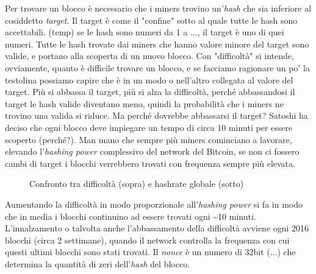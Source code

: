 \documentclass {article}
\begin{document}
Per trovare un blocco è necessario che i miners trovino un'\textit{hash} che sia inferiore al cosiddetto \textit{target}. Il target è come il "confine" sotto al quale tutte le hash sono accettabili.
(temp) se le hash sono numeri da 1 a ..., il target è uno di quei numeri.
Tutte le hash trovate dai miners che hanno valore minore del target sono valide, e portano alla scoperta di un nuovo blocco.
Con "difficoltà" si intende, ovviamente, quanto è difficile trovare un blocco, e se facciamo ragionare un po' la testolina possiamo capire che è in un modo o nell'altro collegata al valore del target.
Più si abbassa il target, più si alza la difficoltà, perché abbassandosi il target le hash valide diventano meno, quindi la probabilità che i miners ne trovino una valida si riduce.
Ma perché dovrebbe abbassarsi il target?
Satoshi ha deciso che ogni blocco deve impiegare un tempo di circa 10 minuti per essere scoperto (perché?).
Man mano che sempre più miners cominciano a lavorare, elevando l'\textit{hashing power} complessivo del network del Bitcoin, se non ci fossero cambi di target i blocchi verrebbero trovati con frequenza sempre più elevata.

\vspace {0.5cm}
\begin{figure}[h]
\caption {Confronto tra difficoltà (sopra) e hashrate globale (sotto)}
\end{figure}
\vspace {0.2cm}
\noindent
%
Aumentando la difficoltà in modo proporzionale all'\textit{hashing power} si fa in modo che in media i blocchi continuino ad essere trovati ogni \textasciitilde 10 minuti.
L'innalzamento o talvolta anche l'abbassamento della difficoltà avviene ogni 2016 blocchi (circa 2 settimane), quando il network controlla la frequenza con cui questi ultimi blocchi sono stati trovati.
Il \textit{nonce} è un numero di 32bit (...) che determina la quantità di zeri dell'\textit{hash} del blocco.
\end{document}
